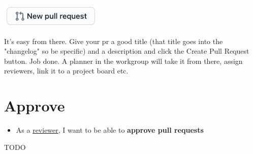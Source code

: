 \begin{center}
    \includegraphics[scale=0.5]{../images/ekgmm-process-pr-button.png}
\end{center}

It’s easy from there. 
Give your \gls{pr} a good title (that title goes into the "changelog" so be 
specific) and a description and click the Create Pull Request button. 
Job done. A planner in the workgroup will take it from there, 
assign reviewers, link it to a project board etc.

\section{Approve}
\label{sec:ekg-mm-process-approve}

\begin{tcolorbox}[colback=secondary!5,colframe=secondary!80,title=\textbf{User Stories}]
    \begin{itemize}[leftmargin=1em]
        \item As a \underline{reviewer}, I want to be able to \textbf{approve pull requests}
    \end{itemize}
\end{tcolorbox}

TODO
